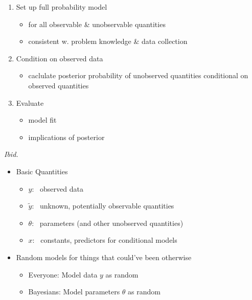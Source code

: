 \documentclass[10pt]{report}
\newcommand{\sld}[1]{\newpage{\noindent\LARGE \ \ \
    \textcolor{MidnightBlue}{\bfseries #1}}\vspace*{4pt}}
\begin{document}
\sld{Bayesian Mechanics}
%
\begin{enumerate}
\item Set up full probability model 
\vspace*{-4pt}
\begin{itemize}
\item for all observable \& unobservable quantities
\item consistent w. problem knowledge \& data collection
\end{itemize}
%
\item Condition on observed data
\vspace*{-4pt}
\begin{itemize}
\item caclulate posterior probability of unobserved quantities
  conditional on observed quantities
\end{itemize}
%
\item Evaluate 
\vspace*{-4pt}
\begin{itemize}
\item model fit 
\item implications of posterior
\end{itemize}
\end{enumerate}

\vfill\hfill {\footnotesize {\slshape Ibid.}}

\sld{Basic Quantities}
%
\begin{itemize}
\item Basic Quantities
\vspace*{-4pt}
\begin{itemize}
\item $y$: \ observed data
\item $\tilde{y}$: \ unknown, potentially observable quantities
\item $\theta$: \ parameters (and other unobserved quantities)
\item $x$: \ constants, predictors for conditional models
\end{itemize}
\item Random models for things that could've been otherwise
\begin{itemize}
\item Everyone: Model data $y$ as random
\item Bayesians:  Model parameters $\theta$ as random
\end{itemize}
\end{itemize}


\sld{Distribution Naming Conventions}
\end{document}
